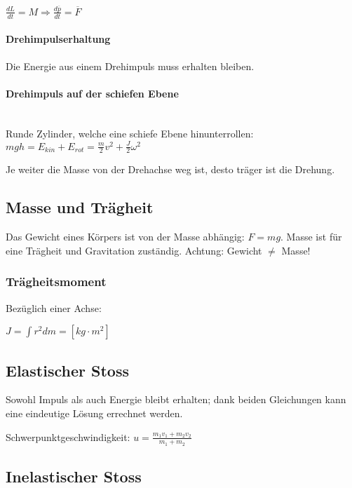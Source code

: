 \documentclass[a4paper]{scrartcl}
\begin{document}
	$\frac{dL}{dt} = M \Rightarrow \frac{d\overline{p}}{dt} = \overline{F}$
	


	\paragraph{Drehimpulserhaltung}
	
	Die Energie aus einem Drehimpuls muss erhalten bleiben.
	
	
	\paragraph{Drehimpuls auf der schiefen Ebene} \hfill \\
	
	Runde Zylinder, welche eine schiefe Ebene hinunterrollen: $mgh = E_{kin} + E_{rot} =\frac{m}{2} v^2 + \frac{J}{2} \omega^2$
	
	Je weiter die Masse von der Drehachse weg ist, desto träger ist die Drehung.
	

\subsection{Masse und Trägheit}
	Das Gewicht eines Körpers ist von der Masse abhängig: $F = mg$.
	Masse ist für eine Trägheit und Gravitation zuständig. Achtung: Gewicht $\neq$ Masse!



\subsubsection{Trägheitsmoment}

	
	Bezüglich einer Achse:
	
	$J = \int r^2 d m = \left[ kg \cdot m^2 \right]$

\subsection{Elastischer Stoss}
	Sowohl Impuls als auch Energie bleibt erhalten; dank beiden Gleichungen kann eine eindeutige Lösung errechnet werden.
	
	Schwerpunktgeschwindigkeit: $u = \frac{m_1 v_1 + m_2 v_2}{m_1 + m_2}$ %


\subsection{Inelastischer Stoss}
\end{document}
